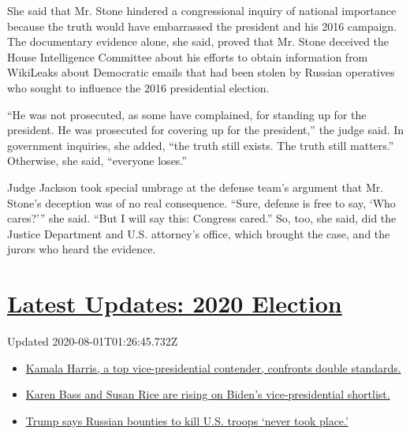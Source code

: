 She said that Mr. Stone hindered a congressional inquiry of national
importance because the truth would have embarrassed the president and
his 2016 campaign. The documentary evidence alone, she said, proved that
Mr. Stone deceived the House Intelligence Committee about his efforts to
obtain information from WikiLeaks about Democratic emails that had been
stolen by Russian operatives who sought to influence the 2016
presidential election.

``He was not prosecuted, as some have complained, for standing up for
the president. He was prosecuted for covering up for the president,''
the judge said. In government inquiries, she added, ``the truth still
exists. The truth still matters.'' Otherwise, she said, ``everyone
loses.''

Judge Jackson took special umbrage at the defense team's argument that
Mr. Stone's deception was of no real consequence. ``Sure, defense is
free to say, `Who cares?''' she said. ``But I will say this: Congress
cared.'' So, too, she said, did the Justice Department and U.S.
attorney's office, which brought the case, and the jurors who heard the
evidence.

\hypertarget{latest-updates-2020-election}{%
\section{\texorpdfstring{\href{https://www.nytimes.com/2020/07/31/us/elections/biden-vs-trump.html?action=click\&pgtype=Article\&state=default\&region=MAIN_CONTENT_1\&context=storylines_live_updates}{Latest
Updates: 2020
Election}}{Latest Updates: 2020 Election}}\label{latest-updates-2020-election}}

Updated 2020-08-01T01:26:45.732Z

\begin{itemize}
\tightlist
\item
  \href{https://www.nytimes.com/2020/07/31/us/elections/biden-vs-trump.html?action=click\&pgtype=Article\&state=default\&region=MAIN_CONTENT_1\&context=storylines_live_updates\#link-29fdff45}{Kamala
  Harris, a top vice-presidential contender, confronts double
  standards.}
\item
  \href{https://www.nytimes.com/2020/07/31/us/elections/biden-vs-trump.html?action=click\&pgtype=Article\&state=default\&region=MAIN_CONTENT_1\&context=storylines_live_updates\#link-13ec3d9c}{Karen
  Bass and Susan Rice are rising on Biden's vice-presidential
  shortlist.}
\item
  \href{https://www.nytimes.com/2020/07/31/us/elections/biden-vs-trump.html?action=click\&pgtype=Article\&state=default\&region=MAIN_CONTENT_1\&context=storylines_live_updates\#link-49e9a016}{Trump
  says Russian bounties to kill U.S. troops `never took place.'}
\end{itemize}

